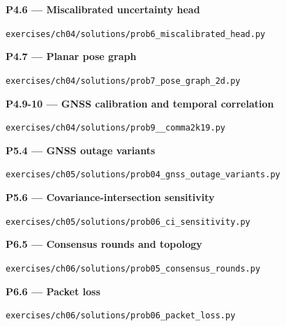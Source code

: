\documentclass[graybox,envcountchap]{style/SNmono}
\newcommand{\repopath}[1]{\texttt{#1}}
\begin{document}
\par\medskip{}\label{code:P4.6}
\noindent\textbf{P4.6 --- Miscalibrated uncertainty head}\par
\noindent\repopath{exercises/\allowbreak ch04/\allowbreak solutions/\allowbreak prob6\_\allowbreak miscalibrated\_\allowbreak head.py}\par

\par\medskip{}\label{code:P4.7}
\noindent\textbf{P4.7 --- Planar pose graph}\par
\noindent\repopath{exercises/\allowbreak ch04/\allowbreak solutions/\allowbreak prob7\_\allowbreak pose\_\allowbreak graph\_\allowbreak 2d.py}\par

\par\medskip{}\label{code:P4.9-10}
\noindent\textbf{P4.9-10 --- GNSS calibration and temporal correlation}\par
\noindent\repopath{exercises/\allowbreak ch04/\allowbreak solutions/\allowbreak prob9\_\allowbreak 10\_\allowbreak comma2k19.py}\par

\par\medskip{}\label{code:P5.4}
\noindent\textbf{P5.4 --- GNSS outage variants}\par
\noindent\repopath{exercises/\allowbreak ch05/\allowbreak solutions/\allowbreak prob04\_\allowbreak gnss\_\allowbreak outage\_\allowbreak variants.py}\par

\par\medskip{}\label{code:P5.6}
\noindent\textbf{P5.6 --- Covariance-intersection sensitivity}\par
\noindent\repopath{exercises/\allowbreak ch05/\allowbreak solutions/\allowbreak prob06\_\allowbreak ci\_\allowbreak sensitivity.py}\par

\par\medskip{}\label{code:P6.5}
\noindent\textbf{P6.5 --- Consensus rounds and topology}\par
\noindent\repopath{exercises/\allowbreak ch06/\allowbreak solutions/\allowbreak prob05\_\allowbreak consensus\_\allowbreak rounds.py}\par

\par\medskip{}\label{code:P6.6}
\noindent\textbf{P6.6 --- Packet loss}\par
\noindent\repopath{exercises/\allowbreak ch06/\allowbreak solutions/\allowbreak prob06\_\allowbreak packet\_\allowbreak loss.py}\par
\end{document}

